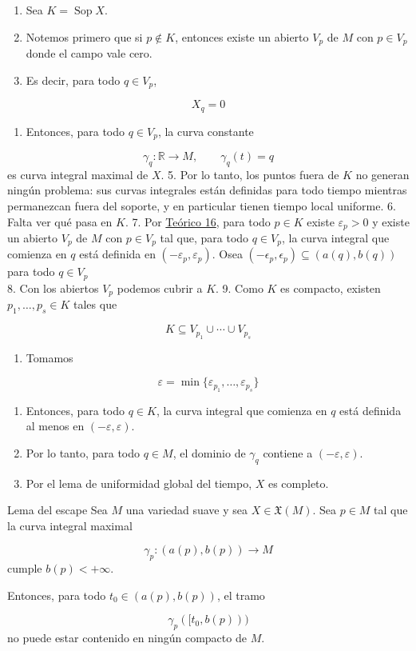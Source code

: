 \begin{bookproof}{}
\begin{enumerate}
\item Sea $K=\operatorname{Sop}X$.
\item Notemos primero que si $p\notin K$, entonces existe un abierto $V_p$ de $M$ con $p\in V_p$ donde el campo vale cero.
\item Es decir, para todo $q\in V_p$,
\end{enumerate}
\[
X_q=0
\]
\begin{enumerate}[start=4]
\item Entonces, para todo $q\in V_p$, la curva constante
\end{enumerate}
\[
\gamma_q:\mathbb R\to M,\qquad \gamma_q(t)=q
\]
es curva integral maximal de $X$. 5. Por lo tanto, los puntos fuera de $K$ no generan ningún problema: sus curvas integrales están definidas para todo tiempo mientras permanezcan fuera del soporte, y en particular tienen tiempo local uniforme. 6. Falta ver qué pasa en $K$. 7. Por \hyperref[blk:3b18e6]{Teórico 16}, para todo $p\in K$ existe $\varepsilon_p>0$ y existe un abierto $V_p$ de $M$ con $p\in V_p$ tal que, para todo $q\in V_p$, la curva integral que comienza en $q$ está definida en $(-\varepsilon_p,\varepsilon_p)$. Osea $(-\epsilon_{p},\epsilon_{p})\subseteq (a(q),b(q))$ para todo $q\in V_{p}$\\
8. Con los abiertos $V_p$ podemos cubrir a $K$. 9. Como $K$ es compacto, existen $p_1,\ldots,p_s\in K$ tales que

\[
K\subseteq V_{p_1}\cup\cdots\cup V_{p_s}
\]
\begin{enumerate}[start=10]
\item Tomamos
\end{enumerate}
\[
\varepsilon=\min\{\varepsilon_{p_1},\ldots,\varepsilon_{p_s}\}
\]
\begin{enumerate}[start=11]
\item Entonces, para todo $q\in K$, la curva integral que comienza en $q$ está definida al menos en $(-\varepsilon,\varepsilon)$.
\item Por lo tanto, para todo $q\in M$, el dominio de $\gamma_q$ contiene a $(-\varepsilon,\varepsilon)$.
\item Por el lema de uniformidad global del tiempo, $X$ es completo.
\end{enumerate}
\bookqed
\end{bookproof}
\begin{booklemma}{Lema del escape}
Sea $M$ una variedad suave y sea $X\in\mathfrak X(M)$. Sea $p\in M$ tal que la curva integral maximal

\[
\gamma_p:(a(p),b(p))\to M
\]
cumple $b(p)<+\infty$.

Entonces, para todo $t_0\in(a(p),b(p))$, el tramo

\[
\gamma_p([t_0,b(p)))
\]
no puede estar contenido en ningún compacto de $M$.

\end{booklemma}
